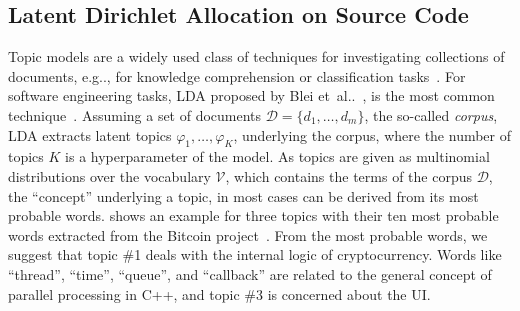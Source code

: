 \documentclass[runningheads]{llncs}
\makeatletter
\DeclareRobustCommand\onedot{\futurelet\@let@token\@onedot}
\def\@onedot{\ifx\@let@token.\else.\null\fi\xspace}
\def\etal{et~al\onedot}
\def\eg{e.g\onedot,\xspace}
\makeatother
\begin{document}
\subsection{Latent Dirichlet Allocation on Source Code}
Topic models are a widely used class of techniques for investigating collections of documents, \eg for knowledge comprehension or classification tasks~\cite{aggarwal2012mining}.
For software engineering tasks, \ac{LDA} proposed by Blei \etal~\cite{blei2003latent}, is the most common technique~\cite{chen2016survey}.
Assuming a set of documents $\mathcal{D} = \{d_1, \dots, d_m\}$, the so-called \textsl{corpus}, \ac{LDA} extracts latent topics $\varphi_1, \dots, \varphi_K$, underlying the corpus, where the number of topics $K$ is a hyperparameter of the model. 
As topics are given as multinomial distributions over the vocabulary $\mathcal{V}$, which contains the terms of the corpus $\mathcal{D}$, the \enquote{concept} underlying a topic, in most cases can be derived from its most probable words.
 shows an example for three topics with their ten most probable words extracted from the Bitcoin project~\cite{atzberger2021softwareforest}.
From the most probable words, we suggest that topic \#1 deals with the internal logic of cryptocurrency.
Words like \enquote{thread}, \enquote{time}, \enquote{queue}, and \enquote{callback} are related to the general concept of parallel processing in C++, and topic \#3 is concerned about the UI.
\end{document}
